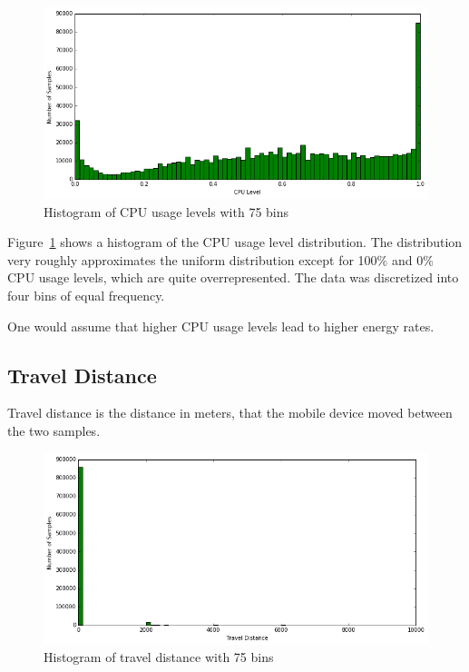 \begin{figure} %
	\centering
	\includegraphics[width=\textwidth]{images/carat-data/cpu_level.png}
	\caption{Histogram of CPU usage levels with 75 bins}
	\label{figure:carat-data-cpu-level}
\end{figure}  

Figure~\ref{figure:carat-data-cpu-level} shows a histogram of the CPU usage level distribution. The distribution very roughly approximates the uniform distribution except for 100\% and 0\% CPU usage levels, which are quite overrepresented. The data was discretized into four bins of equal frequency.

One would assume that higher CPU usage levels lead to higher energy rates. 

\subsection{Travel Distance}  

Travel distance is the distance in meters, that the mobile device moved between the two samples. 

\begin{figure} %
	\centering
	\includegraphics[width=\textwidth]{images/carat-data/travel_distance.png}
	\caption{Histogram of travel distance with 75 bins}
	\label{figure:carat-data-travel-distance}
\end{figure}  

